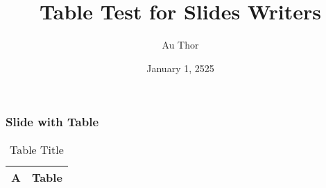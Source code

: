 \documentclass[t,english]{beamer}
\newlength{\DUtablewidth} %
\begin{document}
\title[Table Test for Slides Writers]{Table Test for Slides Writers%
  \label{table-test-for-slides-writers}}
\author[Au Thor]{Au Thor}
\date{January 1, 2525}
\maketitle

\begin{frame}%
\frametitle{Slide with Table}

\setlength{\DUtablewidth}{\linewidth}
\begin{longtable}[c]{|p{0.063\DUtablewidth}|p{0.075\DUtablewidth}|}
\caption{Table Title}\\
\hline

A
 &
Table
 \\
\hline
\end{longtable}
\end{frame}
\end{document}
